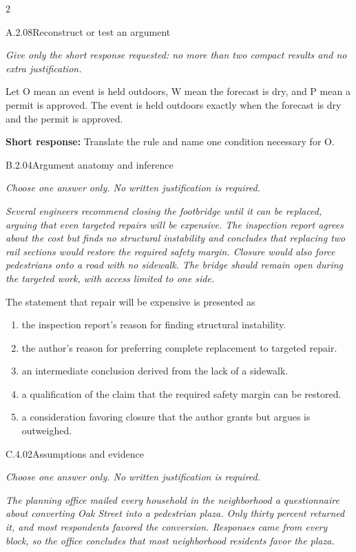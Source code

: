 \documentclass[9pt]{extarticle}
\newcommand{\choice}[1]{\item #1}
\begin{document}
\begin{multicols}{2}
\begin{DenseCoreProblem}{A.2.08}{Reconstruct or test an argument}
{\scriptsize\textit{Give only the short response requested: no more than two compact results and no extra justification.}\par}
Let O mean an event is held outdoors, W mean the forecast is dry, and P mean a permit is approved. The event is held outdoors exactly when the forecast is dry and the permit is approved.

\textbf{Short response:} Translate the rule and name one condition necessary for O.
\end{DenseCoreProblem}
\begin{DenseCoreProblem}{B.2.04}{Argument anatomy and inference}
{\scriptsize\textit{Choose one answer only. No written justification is required.}\par}
\emph{Several engineers recommend closing the footbridge until it can be replaced, arguing that even targeted repairs will be expensive. The inspection report agrees about the cost but finds no structural instability and concludes that replacing two rail sections would restore the required safety margin. Closure would also force pedestrians onto a road with no sidewalk. The bridge should remain open during the targeted work, with access limited to one side.}

The statement that repair will be expensive is presented as
\begin{enumerate}[label=(\alph*)]
  \choice{the inspection report's reason for finding structural instability.}
  \choice{the author's reason for preferring complete replacement to targeted repair.}
  \choice{an intermediate conclusion derived from the lack of a sidewalk.}
  \choice{a qualification of the claim that the required safety margin can be restored.}
  \choice{a consideration favoring closure that the author grants but argues is outweighed.}
\end{enumerate}
\end{DenseCoreProblem}
\columnbreak
\begin{DenseCoreProblem}{C.4.02}{Assumptions and evidence}
{\scriptsize\textit{Choose one answer only. No written justification is required.}\par}
\emph{The planning office mailed every household in the neighborhood a questionnaire about converting Oak Street into a pedestrian plaza. Only thirty percent returned it, and most respondents favored the conversion. Responses came from every block, so the office concludes that most neighborhood residents favor the plaza.}


\end{DenseCoreProblem}
\end{multicols}
\end{document}
